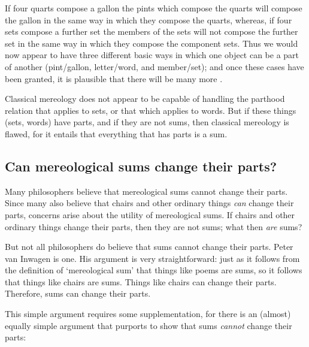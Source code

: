 \documentclass[11pt]{article}
\newenvironment{squote}{%
\begin{spacing}{1}
\begin{list}{}{%
\setlength{\labelwidth}{0pt}%
\rightmargin\leftmargin%
}
\item\relax
}{%
\end{list}%
\end{spacing}
}
\begin{document}
\begin{spacing}{1.5}
\begin{squote}
If four quarts compose a gallon the pints which compose the quarts
will compose the gallon in the same way in which they compose the
quarts, whereas, if four sets compose a further set the members of the
sets will not compose the further set in the same way in which they
compose the component sets.  Thus we would now appear to have three
different basic ways in which one object can be a part of another
(pint/gallon, letter/word, and member/set); and once these cases have
been granted, it is plausible that there will be many more
\citep[562]{fine2010}.
\end{squote}

Classical mereology does not appear to be capable of handling the
parthood relation that applies to sets, or that which applies to
words.  But if these things (sets, words) have parts, and if they are
not sums, then classical mereology is flawed, for it entails that
everything that has parts is a sum.

\subsection{Can mereological sums change their parts?}
\label{change}
Many philosophers believe that mereological sums cannot change their
parts.  Since many also believe that chairs and other ordinary things
{\em can} change their parts, concerns arise about the utility of
mereological sums.  If chairs and other ordinary things change their
parts, then they are not sums; what then {\em are} sums?

But not all philosophers do believe that sums cannot change their
parts.  Peter van Inwagen is one.  His argument is very
straightforward:  just as it follows from the definition of
`mereological sum' that things like poems are sums, so it follows that
things like chairs are sums.  Things like chairs can change their
parts.  Therefore, sums can change their parts.

This simple argument requires some supplementation, for there is an
(almost) equally simple argument that purports to show that sums {\em
  cannot} change their parts:


\end{spacing}
\end{document}
